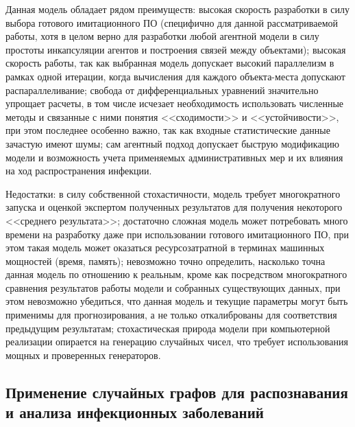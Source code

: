 Данная модель обладает рядом преимуществ: высокая скорость разработки в силу выбора готового имитационного ПО (специфично для данной рассматриваемой работы, хотя в целом верно для разработки любой агентной модели в силу простоты инкапсуляции агентов и построения связей между объектами); высокая скорость работы, так как выбранная модель допускает высокий параллелизм в рамках одной итерации, когда вычисления для каждого объекта-места допускают распараллеливание; свобода от дифференциальных уравнений значительно упрощает расчеты, в том числе исчезает необходимость использовать численные методы и связанные с ними понятия <<сходимости>> и <<устойчивости>>, при этом последнее особенно важно, так как входные статистические данные зачастую имеют шумы;  сам агентный подход допускает быструю модификацию модели и возможность учета применяемых административных мер  и их влияния на ход распространения инфекции.

Недостатки: в силу собственной стохастичности, модель требует многократного запуска  и оценкой экспертом полученных результатов для получения некоторого <<среднего результата>>; достаточно сложная модель может потребовать много времени на разработку даже при использовании готового имитационного ПО, при этом такая модель может оказаться ресурсозатратной в терминах машинных мощностей (время, память); невозможно точно определить, насколько точна данная модель по отношению к реальным, кроме как посредством многократного сравнения результатов работы модели и собранных существующих данных, при этом невозможно убедиться, что данная модель и текущие параметры могут быть применимы для прогнозирования, а не только откалиброваны для соответствия предыдущим результатам; стохастическая природа модели при компьютерной реализации опирается на генерацию случайных чисел, что требует использования мощных и проверенных генераторов. 

\subsection{Применение случайных графов для распознавания и анализа инфекционных заболеваний}

